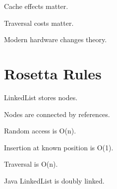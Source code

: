 \documentclass[11pt,a4paper]{book}
\begin{document}
Cache effects matter.


Traversal costs matter.


Modern hardware changes theory.


\section{Rosetta Rules}

\begin{rosettarule}

LinkedList stores nodes.

\end{rosettarule}


\begin{rosettarule}

Nodes are connected by references.

\end{rosettarule}


\begin{rosettarule}

Random access is O(n).

\end{rosettarule}


\begin{rosettarule}

Insertion at known position
is O(1).

\end{rosettarule}


\begin{rosettarule}

Traversal is O(n).

\end{rosettarule}


\begin{rosettarule}

Java LinkedList is doubly linked.

\end{rosettarule}
\end{document}
